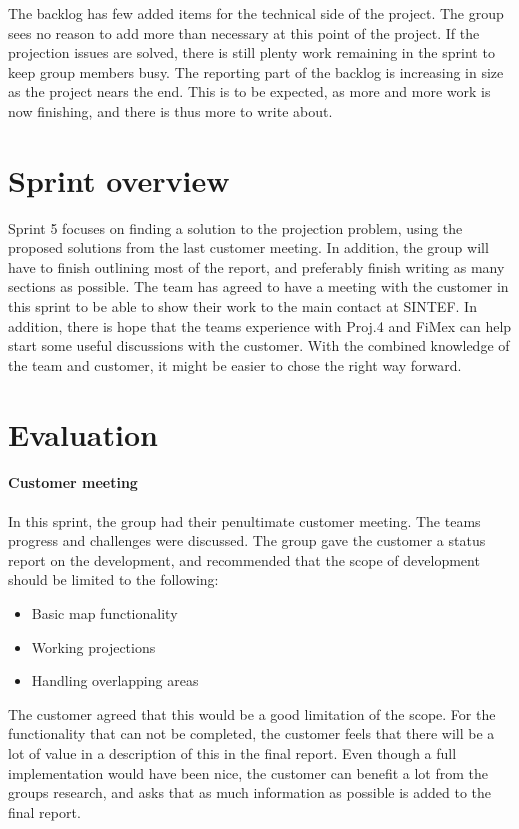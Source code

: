 \documentclass[11pt,a4paper,titlepage,oneside]{report}
\begin{document}
The backlog has few added items for the technical side of the project. The group sees no reason to add more than necessary at this point of the project. If the projection issues are solved, there is still plenty work remaining in the sprint to keep group members busy. The reporting part of the backlog is increasing in size as the project nears the end. This is to be expected, as more and more work is now finishing, and there is thus more to write about. 

\section{Sprint overview}
Sprint 5 focuses on finding a solution to the projection problem, using the proposed solutions from the last customer meeting. In addition, the group will have to finish outlining most of the report, and preferably finish writing as many sections as possible. The team has agreed to have a meeting with the customer in this sprint to be able to show their work to the main contact at SINTEF. In addition, there is hope that the teams experience with Proj.4 and FiMex can help start some useful discussions with the customer. With the combined knowledge of the team and customer, it might be easier to chose the right way forward. 

\section{Evaluation}
\label{sec:Sprint5Evaluation}
\paragraph{Customer meeting}
In this sprint, the group had their penultimate customer meeting. The teams progress and challenges were discussed. The group gave the customer a status report on the development, and recommended that the scope of development should be limited to the following:

\begin{itemize}
\item Basic map functionality
\item Working projections
\item Handling overlapping areas
\end{itemize}

The customer agreed that this would be a good limitation of the scope. For the functionality that can not be completed, the customer feels that there will be a lot of value in a description of this in the final report. Even though a full implementation would have been nice, the customer can benefit a lot from the groups research, and asks that as much information as possible is added to the final report. 
\end{document}

